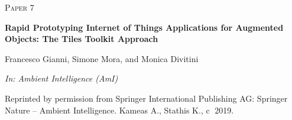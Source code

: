 \cleardoublepage
\begin{flushright}
\textsc{\huge Paper 7}
\end{flushright}
\vspace{3cm}
\begin{center}
	\begin{framed}
		{\Large \textbf{Rapid Prototyping Internet of Things Applications for Augmented Objects: The Tiles Toolkit Approach}}	
		\medskip
		
		Francesco Gianni, Simone Mora, and Monica Divitini
		
		\medskip		
		\emph{In: Ambient Intelligence (AmI)}
	\end{framed}	
\end{center}

\vspace{10cm}

{\scriptsize Reprinted by permission from Springer International Publishing AG: Springer Nature -- Ambient Intelligence. Kameas A., Stathis K., \textcircled{c} 2019.}
\cleardoublepage

